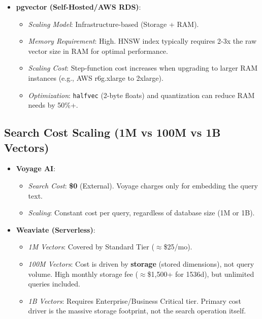\begin{itemize}
\begin{itemize}[noitemsep]
    \item \textbf{pgvector (Self-Hosted/AWS RDS)}:
    \begin{itemize}[noitemsep]
        \item \textit{Scaling Model}: Infrastructure-based (Storage + RAM).
        \item \textit{Memory Requirement}: High. HNSW index typically requires 2-3x the raw vector size in RAM for optimal performance.
        \item \textit{Scaling Cost}: Step-function cost increases when upgrading to larger RAM instances (e.g., AWS r6g.xlarge to 2xlarge).
        \item \textit{Optimization}: \texttt{halfvec} (2-byte floats) and quantization can reduce RAM needs by 50\%+.
    \end{itemize}
\end{itemize}

\subsection{Search Cost Scaling (1M vs 100M vs 1B Vectors)}

\begin{itemize}
    \item \textbf{Voyage AI}:
    \begin{itemize}[noitemsep]
        \item \textit{Search Cost}: \textbf{\$0} (External). Voyage charges only for embedding the query text.
        \item \textit{Scaling}: Constant cost per query, regardless of database size (1M or 1B).
    \end{itemize}

    \item \textbf{Weaviate (Serverless)}:
    \begin{itemize}[noitemsep]
        \item \textit{1M Vectors}: Covered by Standard Tier ($\approx$\$25/mo).
        \item \textit{100M Vectors}: Cost is driven by \textbf{storage} (stored dimensions), not query volume. High monthly storage fee ($\approx$\$1,500+ for 1536d), but unlimited queries included.
        \item \textit{1B Vectors}: Requires Enterprise/Business Critical tier. Primary cost driver is the massive storage footprint, not the search operation itself.
    \end{itemize}


\end{itemize}
\end{itemize}
